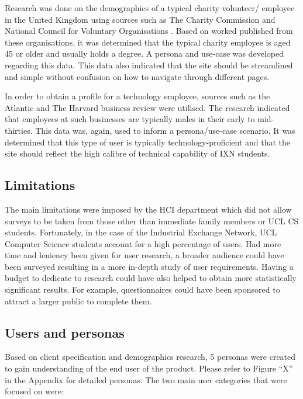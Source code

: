 Research was done on the demographics of a typical charity volunteer/
employee in the United Kingdom using sources such as The Charity
Commission \cite{ps2} and National Council for Voluntary Organisations
\cite{ps3}. Based on worked published from these organisations, it was
determined that the typical charity employee is aged 45 or older and
usually holds a degree. A persona and use-case was developed regarding
this data. This data also indicated that the site should be streamlined
and simple without confusion on how to navigate through different pages.

In order to obtain a profile for a technology employee, sources such as
the Atlantic \cite{ps4} and The Harvard business review \cite{ps5} were
utilised. The research indicated that employees at such businesses are
typically males in their early to mid-thirties. This data was, again,
used to inform a persona/use-case scenario. It was determined that this
type of user is typically technology-proficient and that the site should
reflect the high calibre of technical capability of IXN students.

\hypertarget{limitations}{%
\subsection{Limitations}\label{limitations}}

The main limitations were imposed by the HCI department which did not
allow surveys to be taken from those other than immediate family members
or UCL CS students. Fortunately, in the case of the Industrial Exchange
Network, UCL Computer Science students account for a high percentage of
users. Had more time and leniency been given for user research, a
broader audience could have been surveyed resulting in a more in-depth
study of user requirements. Having a budget to dedicate to research
could have also helped to obtain more statistically significant results.
For example, questionnaires could have been sponsored to attract a
larger public to complete them.

\hypertarget{users-and-personas}{%
\subsection{Users and personas}\label{users-and-personas}}

Based on client specification and demographics research, 5 personas were
created to gain understanding of the end user of the product. Please
refer to Figure ``X'' in the Appendix for detailed personas. The two
main user categories that were focused on were: ​

